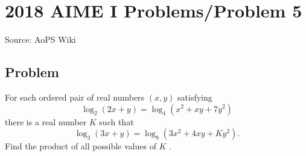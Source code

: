 \documentclass[12pt]{article}
\begin{document}
\section*{{2018 AIME I Problems/Problem 5}}
Source: AoPS Wiki

\subsection*{Problem}
For each ordered pair of real numbers $(x,y)$ satisfying \[\log_2(2x+y) = \log_4(x^2+xy+7y^2)\] there is a real number $K$ such that \[\log_3(3x+y) = \log_9(3x^2+4xy+Ky^2).\] Find the product of all possible values of $K$ .
\end{document}
